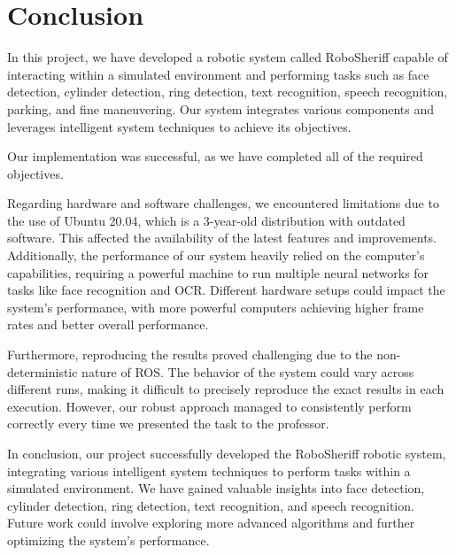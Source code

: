 \documentclass{article}
\begin{document}
\section{Conclusion}

In this project, we have developed a robotic system called RoboSheriff capable of interacting within a simulated environment and performing tasks such as face detection, cylinder detection, ring detection, text recognition, speech recognition, parking, and fine maneuvering. Our system integrates various components and leverages intelligent system techniques to achieve its objectives.

Our implementation was successful, as we have completed all of the required objectives.

Regarding hardware and software challenges, we encountered limitations due to the use of Ubuntu 20.04, which is a 3-year-old distribution with outdated software. This affected the availability of the latest features and improvements. Additionally, the performance of our system heavily relied on the computer's capabilities, requiring a powerful machine to run multiple neural networks for tasks like face recognition and OCR. Different hardware setups could impact the system's performance, with more powerful computers achieving higher frame rates and better overall performance.

Furthermore, reproducing the results proved challenging due to the non-deterministic nature of ROS. The behavior of the system could vary across different runs, making it difficult to precisely reproduce the exact results in each execution. However, our robust approach managed to consistently perform correctly every time we presented the task to the professor.

In conclusion, our project successfully developed the RoboSheriff robotic system, integrating various intelligent system techniques to perform tasks within a simulated environment. We have gained valuable insights into face detection, cylinder detection, ring detection, text recognition, and speech recognition. Future work could involve exploring more advanced algorithms and further optimizing the system's performance.
\end{document}
